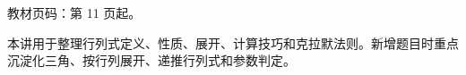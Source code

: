 
\begin{knowledgeBox}
教材页码：第 11 页起。

本讲用于整理行列式定义、性质、展开、计算技巧和克拉默法则。新增题目时重点沉淀化三角、按行列展开、递推行列式和参数判定。
\end{knowledgeBox}
